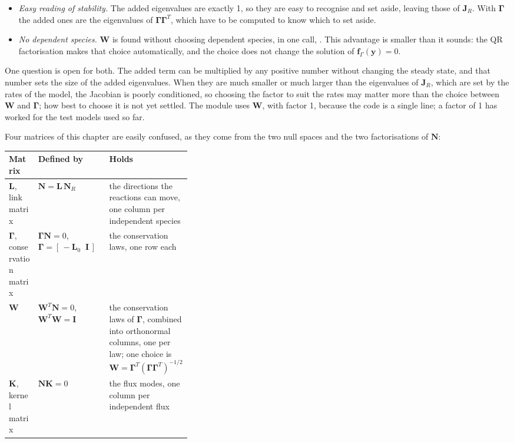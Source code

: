 \documentclass[11pt,a4paper,openany]{report}
\begin{document}
{{\begin{itemize}
\begin{itemize}
    exactly 1. With $\mathbf{\Gamma}$ they are the eigenvalues of
    $\mathbf{\Gamma}\mathbf{\Gamma}^T$, which spread out when laws involve
    many species or large weights: the law $\mathrm{ATP} + \mathrm{ADP} +
    \mathrm{AMP}$ counts for more than a law of two species, which can make
    the Jacobian less well conditioned.
  \item \emph{Easy reading of stability.} The added eigenvalues are exactly
    1, so they are easy to recognise and set aside, leaving those of
    $\mathbf{J}_R$. With $\mathbf{\Gamma}$ the added ones are the
    eigenvalues of $\mathbf{\Gamma}\mathbf{\Gamma}^T$, which have to be
    computed to know which to set aside.
  \item \emph{No dependent species.} $\mathbf{W}$ is found without choosing
    dependent species, in one call, . This advantage
    is smaller than it sounds: the QR factorisation makes that choice
    automatically, and the choice does not change the solution of
    $\mathbf{f}_\Gamma(\mathbf{y}) = 0$.
  \end{itemize}
\end{itemize}

\noindent One question is open for both. The added term can be multiplied
by any positive number without changing the steady state, and that number
sets the size of the added eigenvalues. When they are much smaller or much
larger than the eigenvalues of $\mathbf{J}_R$, which are set by the rates
of the model, the Jacobian is poorly conditioned, so choosing the factor to
suit the rates may matter more than the choice between $\mathbf{W}$ and
$\mathbf{\Gamma}$; how best to choose it is not yet settled. The module
uses $\mathbf{W}$, with factor 1, because the code is a single line; a
factor of 1 has worked for the test models used so far.

Four matrices of this chapter are easily confused, as they come from the
two null spaces and the two factorisations of $\mathbf{N}$:

\begin{center}
\begin{tabular}{@{}l l >{\raggedright\arraybackslash}p{0.36\linewidth}@{}}
\toprule
Matrix & Defined by & Holds \\
\midrule
$\mathbf{L}$, link matrix & $\mathbf{N} = \mathbf{L}\,\mathbf{N}_R$ & the
  directions the reactions can move, one column per independent species \\
$\mathbf{\Gamma}$, conservation matrix & $\mathbf{\Gamma}\mathbf{N} = 0$,
  $\mathbf{\Gamma} = [\,-\mathbf{L}_0 \;\; \mathbf{I}\,]$ & the
  conservation laws, one row each \\
$\mathbf{W}$ & $\mathbf{W}^T\mathbf{N} = 0$, $\mathbf{W}^T\mathbf{W} =
  \mathbf{I}$ & the conservation laws of $\mathbf{\Gamma}$, combined into
  orthonormal columns, one per law; one choice
  is $\mathbf{W} = \mathbf{\Gamma}^T (\mathbf{\Gamma}\mathbf{\Gamma}^T)^{-1/2}$ \\
$\mathbf{K}$, kernel matrix & $\mathbf{N}\mathbf{K} = 0$ & the flux modes,
  one column per independent flux \\
\bottomrule
\end{tabular}
\end{center}

}}
\end{document}

